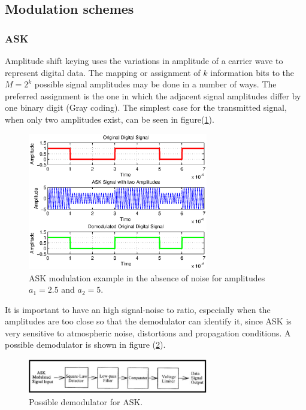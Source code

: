 \documentclass[12pt,a4paper,openright]{article}
\begin{document}
\subsection{Modulation schemes}

\subsubsection{ASK}
Amplitude shift keying uses the variations in amplitude of a carrier wave to represent digital data. The mapping or assignment of $k$ information bits to the $M=2^k$ possible signal amplitudes may be done in a number of ways. The preferred assignment is the one in which the adjacent  signal amplitudes differ by one binary digit (Gray coding). The simplest case for the transmitted signal, when only two amplitudes exist, can be seen in figure(\ref{ask}). 

\begin{figure}[h]
  \centering
    \includegraphics[width=0.7\textwidth]{ASKexample.eps}
    \caption{ASK modulation example in the absence of noise for amplitudes $a_1=2.5$ and $a_2=5$.}
    \label{ask}
\end{figure}

It is important to have an high signal-noise to ratio, especially when the amplitudes are too close so that the demodulator can identify it, since ASK is very sensitive to atmospheric noise, distortions and propagation conditions.  A possible demodulator is shown in figure (\ref{askdem}).

\begin{figure}[h]
  \centering
    \includegraphics[width=0.7\textwidth]{askdem.pdf}
    \caption{Possible demodulator for ASK.}
    \label{askdem}
\end{figure}
\end{document}

